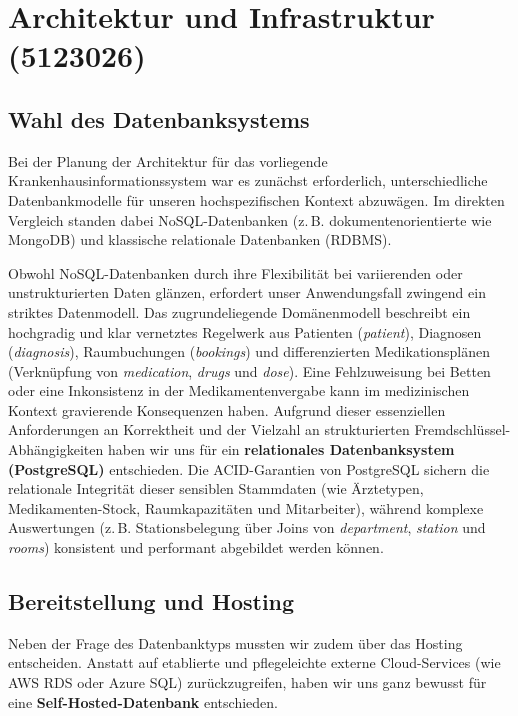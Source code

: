 \section{Architektur und Infrastruktur (5123026)}

\subsection{Wahl des Datenbanksystems}

Bei der Planung der Architektur für das vorliegende Krankenhausinformationssystem war es zunächst erforderlich, unterschiedliche Datenbankmodelle für unseren hochspezifischen Kontext abzuwägen. Im direkten Vergleich standen dabei NoSQL-Datenbanken (z.\,B. dokumentenorientierte wie MongoDB) und klassische relationale Datenbanken (RDBMS). 

Obwohl NoSQL-Datenbanken durch ihre Flexibilität bei variierenden oder unstrukturierten Daten glänzen, erfordert unser Anwendungsfall zwingend ein striktes Datenmodell. Das zugrundeliegende Domänenmodell beschreibt ein hochgradig und klar vernetztes Regelwerk aus Patienten (\textit{patient}), Diagnosen (\textit{diagnosis}), Raumbuchungen (\textit{bookings}) und differenzierten Medikationsplänen (Verknüpfung von \textit{medication}, \textit{drugs} und \textit{dose}). Eine Fehlzuweisung bei Betten oder eine Inkonsistenz in der Medikamentenvergabe kann im medizinischen Kontext gravierende Konsequenzen haben. Aufgrund dieser essenziellen Anforderungen an Korrektheit und der Vielzahl an strukturierten Fremdschlüssel-Abhängigkeiten haben wir uns für ein \textbf{relationales Datenbanksystem (PostgreSQL)} entschieden. Die ACID-Garantien von PostgreSQL sichern die relationale Integrität dieser sensiblen Stammdaten (wie Ärztetypen, Medikamenten-Stock, Raumkapazitäten und Mitarbeiter), während komplexe Auswertungen (z.\,B. Stationsbelegung über Joins von \textit{department}, \textit{station} und \textit{rooms}) konsistent und performant abgebildet werden können.

\subsection{Bereitstellung und Hosting}

Neben der Frage des Datenbanktyps mussten wir zudem über das Hosting entscheiden. Anstatt auf etablierte und pflegeleichte externe Cloud-Services (wie AWS RDS oder Azure SQL) zurückzugreifen, haben wir uns ganz bewusst für eine \textbf{Self-Hosted-Datenbank} entschieden. 

